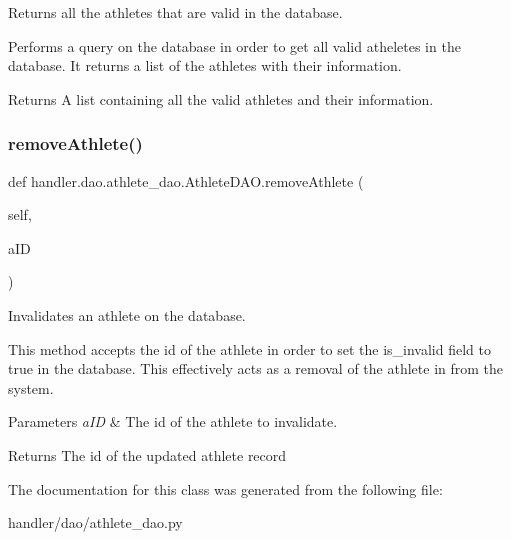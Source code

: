 Returns all the athletes that are valid in the database. 

Performs a query on the database in order to get all valid atheletes in the database. It returns a list of the athletes with their information.

\begin{DoxyReturn}{Returns}
A list containing all the valid athletes and their information. 
\end{DoxyReturn}
\mbox{\label{classhandler_1_1dao_1_1athlete__dao_1_1_athlete_d_a_o_a2677d09a6586e6742190c81270dc408a}} 
\subsubsection{\texorpdfstring{remove\+Athlete()}{removeAthlete()}}
{\footnotesize\ttfamily def handler.\+dao.\+athlete\+\_\+dao.\+Athlete\+D\+A\+O.\+remove\+Athlete (\begin{DoxyParamCaption}\item[{}]{self,  }\item[{}]{a\+ID }\end{DoxyParamCaption})}



Invalidates an athlete on the database. 

This method accepts the id of the athlete in order to set the is\+\_\+invalid field to true in the database. This effectively acts as a removal of the athlete in from the system.


\begin{DoxyParams}{Parameters}
{\em a\+ID} & The id of the athlete to invalidate.\\
\hline
\end{DoxyParams}
\begin{DoxyReturn}{Returns}
The id of the updated athlete record 
\end{DoxyReturn}


The documentation for this class was generated from the following file\+:\begin{DoxyCompactItemize}
\item 
handler/dao/athlete\+\_\+dao.\+py\end{DoxyCompactItemize}
